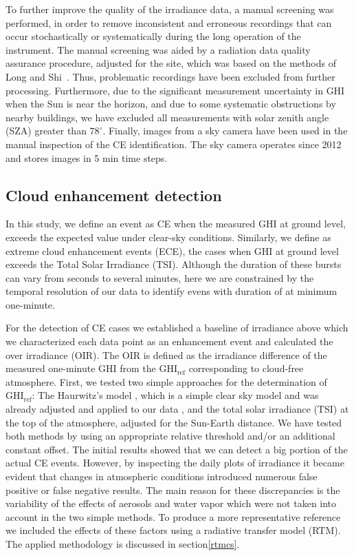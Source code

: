 \documentclass[preprint, 5p,
authoryear]{elsarticle} %
\begin{document}
To further improve the quality of the irradiance data, a manual
screening was performed, in order to remove inconsistent and erroneous
recordings that can occur stochastically or systematically during the
long operation of the instrument. The manual screening was aided by a
radiation data quality assurance procedure, adjusted for the site, which
was based on the methods of Long and Shi~\citep{Long2006, Long2008a}.
Thus, problematic recordings have been excluded from further processing.
Furthermore, due to the significant measurement uncertainty in GHI when
the Sun is near the horizon, and due to some systematic obstructions by
nearby buildings, we have excluded all measurements with solar zenith
angle (SZA) greater than \(78^\circ\). Finally, images from a sky camera
have been used in the manual inspection of the CE identification. The
sky camera operates since 2012 and stores images in 5 min time steps.

\hypertarget{cloud-enhancement-detection}{%
\subsection{Cloud enhancement
detection}\label{cloud-enhancement-detection}}

In this study, we define an event as CE when the measured GHI at ground
level, exceeds the expected value under clear-sky conditions. Similarly,
we define as extreme cloud enhancement events (ECE), the cases when GHI
at ground level exceeds the Total Solar Irradiance (TSI). Although the
duration of these bursts can vary from seconds to several minutes, here
we are constrained by the temporal resolution of our data to identify
evens with duration of at minimum one-minute.

For the detection of CE cases we established a baseline of irradiance
above which we characterized each data point as an enhancement event and
calculated the over irradiance (OIR). The OIR is defined as the
irradiance difference of the measured one-minute GHI from the
\(\text{GHI}_\text{ref}\) corresponding to cloud-free atmosphere. First,
we tested two simple approaches for the determination of
\(\text{GHI}_\text{ref}\): The Haurwitz's model \citep{Haurwitz1945},
which is a simple clear sky model and was already adjusted and applied
to our data \citep{Natsis2023}, and the total solar irradiance (TSI) at
the top of the atmosphere, adjusted for the Sun-Earth distance. We have
tested both methods by using an appropriate relative threshold and/or an
additional constant offset. The initial results showed that we can
detect a big portion of the actual CE events. However, by inspecting the
daily plots of irradiance it became evident that changes in atmospheric
conditions introduced numerous false positive or false negative results.
The main reason for these discrepancies is the variability of the
effects of aerosols and water vapor which were not taken into account in
the two simple methods. To produce a more representative reference we
included the effects of these factors using a radiative transfer model
(RTM). The applied methodology is discussed in
section\nobreakspace{}\ref{rtmcs}.
\end{document}
